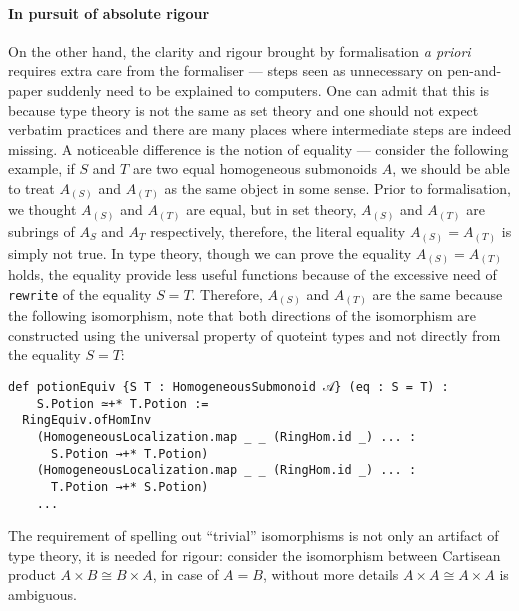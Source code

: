 \documentclass[graybox]{svmult}
\begin{document}
\paragraph{In pursuit of absolute rigour}%
On the other hand, the clarity and rigour brought by formalisation \textit{a priori} requires extra 
care from the formaliser --- steps seen as unnecessary on pen-and-paper suddenly need to 
be explained to computers. One can admit that this is because type theory is not the same as set theory and 
one should not expect verbatim practices and there are many places where intermediate steps are indeed missing.
A noticeable difference is the notion of equality --- consider the following example, if $S$ and $T$ are two equal homogeneous submonoids $A$, 
we should be able to treat $A_{(S)}$ and $A_{(T)}$ as the same object in some sense. 
Prior to formalisation, we thought $A_{(S)}$ and $A_{(T)}$ are equal, but in set theory, $A_{(S)}$ and $A_{(T)}$ are subrings of $A_S$ and $A_T$ respectively,  
therefore, the literal equality $A_{(S)} = A_{(T)}$ is simply not true. 
In type theory, though we can prove the equality $A_{(S)} = A_{(T)}$ holds, the equality provide less useful functions because of the excessive need of \lstinline|rewrite| of the equality $S = T$.
Therefore, $A_{(S)}$ and $A_{(T)}$ are the same because the following isomorphism, note that both directions of the isomorphism are constructed
using the universal property of quoteint types and not directly from the equality $S = T$:
\begin{lstlisting}
def potionEquiv {S T : HomogeneousSubmonoid 𝒜} (eq : S = T) : 
    S.Potion ≃+* T.Potion := 
  RingEquiv.ofHomInv
    (HomogeneousLocalization.map _ _ (RingHom.id _) ... : 
      S.Potion →+* T.Potion)
    (HomogeneousLocalization.map _ _ (RingHom.id _) ... : 
      T.Potion →+* S.Potion)
    ...
\end{lstlisting}
The requirement of spelling out ``trivial'' isomorphisms is not only an artifact of type theory, 
it is needed for rigour: consider the isomorphism between Cartisean product $A \times B \cong B \times A$, in case of $A = B$,
without more details $A \times A \cong A \times A$ is ambiguous. 
\end{document}
